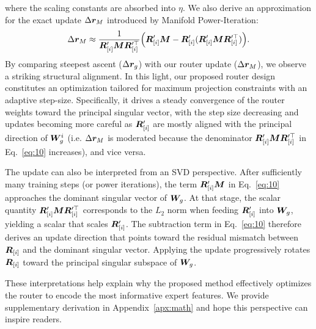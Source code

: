 \documentclass[11pt]{article}
\begin{document}
where the scaling constants are absorbed into $\eta$.
We also derive an approximation for the exact update $\Delta {\bm{r}}_{M}$ introduced by Manifold Power-Iteration:
\begin{equation} 
   \Delta {\bm{r}}_{M} \approx \frac{1}{{\bm{R}}_{[i]}^\prime {\bm{M}} {\bm{R}}_{[i]}^{\prime\top}} {\left( {\bm{R}}_{[i]}^\prime {\bm{M}} - {\bm{R}}_{[i]}^\prime({\bm{R}}_{[i]}^\prime {\bm{M}} {\bm{R}}_{[i]}^{\prime\top}) \right)}.
   \label{eq:10}
\end{equation}
By comparing steepest ascent ($\Delta {\bm{r}}_{g}$) with our router update ($\Delta {\bm{r}}_{M}$), we observe a striking structural alignment.
In this light, our proposed router design constitutes an optimization tailored for maximum projection constraints with an adaptive step-size.
Specifically, it drives a steady convergence of the router weights toward the principal singular vector, with the step size decreasing and updates becoming more careful as ${\bm{R}}_{[i]}^\prime$ are mostly aligned with the principal direction of ${\bm{W}}_g^i$ (i.e. $\Delta {\bm{r}}_{M}$ is moderated because the denominator ${\bm{R}}_{[i]}^\prime {\bm{M}} {\bm{R}}_{[i]}^{\prime\top}$ in Eq.~\ref{eq:10} increases), and vice versa.

The update can also be interpreted from an SVD perspective. After sufficiently many training steps (or power iterations), the term ${\bm{R}}_{[i]}^\prime {\bm{M}}$ in Eq.~\ref{eq:10} approaches the dominant singular vector of ${\bm{W}}_g$.
At that stage, the scalar quantity ${\bm{R}}_{[i]}^\prime {\bm{M}} {\bm{R}}_{[i]}^{\prime\top}$ corresponds to the $L_2$ norm when feeding ${\bm{R}}_{[i]}^\prime$ into ${\bm{W}}_g$, yielding a scalar that scales ${\bm{R}}_{[i]}^\prime$. 
The subtraction term in Eq.~\ref{eq:10} therefore derives an update direction that points toward the residual mismatch between ${\bm{R}}_{[i]}$ and the dominant singular vector. 
Applying the update progressively rotates ${\bm{R}}_{[i]}$ toward the principal singular subspace of ${\bm{W}}_g$.

These interpretations help explain why the proposed method effectively optimizes the router to encode the most informative expert features.
We provide supplementary derivation in Appendix~\ref{apx:math} and hope this perspective can inspire readers.
\end{document}
